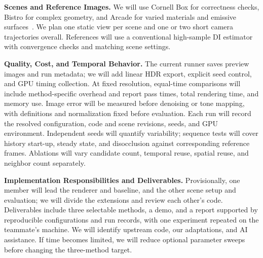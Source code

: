 \documentclass[a4paper]{article}
\begin{document}
\textbf{Scenes and Reference Images.}
We will use Cornell Box for correctness checks, Bistro for complex geometry, and Arcade for varied materials and emissive surfaces~\cite{rtxdiAssets}.
We plan one static view per scene and one or two short camera trajectories overall.
References will use a conventional high-sample DI estimator with convergence checks and matching scene settings.

\textbf{Quality, Cost, and Temporal Behavior.}
The current runner saves preview images and run metadata; we will add linear HDR export, explicit seed control, and GPU timing collection.
At fixed resolution, equal-time comparisons will include method-specific overhead and report pass times, total rendering time, and memory use.
Image error will be measured before denoising or tone mapping, with definitions and normalization fixed before evaluation.
Each run will record the resolved configuration, code and scene revisions, seeds, and GPU environment.
Independent seeds will quantify variability; sequence tests will cover history start-up, steady state, and disocclusion against corresponding reference frames.
Ablations will vary candidate count, temporal reuse, spatial reuse, and neighbor count separately.

\textbf{Implementation Responsibilities and Deliverables.}
Provisionally, one member will lead the renderer and baseline, and the other scene setup and evaluation; we will divide the extensions and review each other's code.
Deliverables include three selectable methods, a demo, and a report supported by reproducible configurations and run records, with one experiment repeated on the teammate's machine.
We will identify upstream code, our adaptations, and AI assistance.
If time becomes limited, we will reduce optional parameter sweeps before changing the three-method target.


\end{document}

